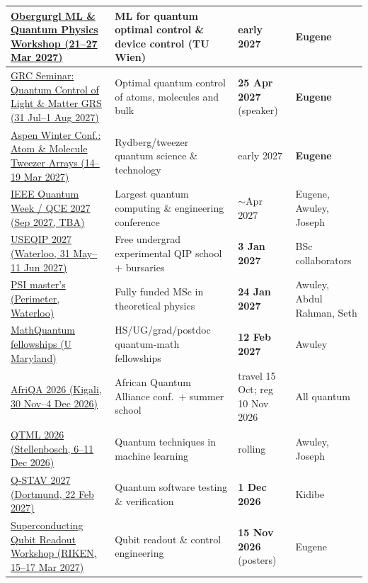 \documentclass[11pt,a4paper]{article}
\begin{document}
\begin{longtable}{@{}p{3.4cm}p{5.6cm}p{2.2cm}p{2.7cm}@{}}
\midrule
\href{https://mlqp-obergurgl.conf.tuwien.ac.at/}{Obergurgl ML \& Quantum Physics Workshop (21--27 Mar 2027)} & ML for quantum optimal control \& device control (TU Wien) & early 2027 & \textbf{Eugene} \\
\midrule
\href{https://www.grc.org/quantum-control-of-light-and-matter-grs-conference/2027/}{GRC Seminar: Quantum Control of Light \& Matter GRS (31 Jul--1 Aug 2027)} & Optimal quantum control of atoms, molecules and bulk & \textbf{25 Apr 2027} (speaker) & \textbf{Eugene} \\
\midrule
\href{https://www.aspentweezerarrays2027.org/}{Aspen Winter Conf.: Atom \& Molecule Tweezer Arrays (14--19 Mar 2027)} & Rydberg/tweezer quantum science \& technology & early 2027 & \textbf{Eugene} \\
\midrule
\href{https://qce.quantum.ieee.org/2026/}{IEEE Quantum Week / QCE 2027 (Sep 2027, TBA)} & Largest quantum computing \& engineering conference & $\sim$Apr 2027 & Eugene, Awuley, Joseph \\
\midrule
\href{https://uwaterloo.ca/institute-for-quantum-computing/events/undergraduate-school-experimental-quantum-information-0}{USEQIP 2027 (Waterloo, 31 May--11 Jun 2027)} & Free undergrad experimental QIP school $+$ bursaries & \textbf{3 Jan 2027} & BSc collaborators \\
\midrule
\href{https://perimeterinstitute.ca/training/masters-program/psi-how-apply}{PSI master's (Perimeter, Waterloo)} & Fully funded MSc in theoretical physics & \textbf{24 Jan 2027} & Awuley, Abdul Rahman, Seth \\
\midrule
\href{https://mathquantum.umd.edu/apply/}{MathQuantum fellowships (U Maryland)} & HS/UG/grad/postdoc quantum-math fellowships & \textbf{12 Feb 2027} & Awuley \\
\midrule
\href{https://afriqa.aimsric.org/}{AfriQA 2026 (Kigali, 30 Nov--4 Dec 2026)} & African Quantum Alliance conf.\ $+$ summer school & travel 15 Oct; reg 10 Nov 2026 & All quantum \\
\midrule
\href{https://africaquantumconsortium.substack.com/p/africa-quantum-consortium-memo-869}{QTML 2026 (Stellenbosch, 6--11 Dec 2026)} & Quantum techniques in machine learning & rolling & Awuley, Joseph \\
\midrule
\href{https://www.spp2514.kit.edu/Q-STAV_2027.php}{Q-STAV 2027 (Dortmund, 22 Feb 2027)} & Quantum software testing \& verification & \textbf{1 Dec 2026} & Kidibe \\
\midrule
\href{https://rqc.riken.jp/sqrw2027/}{Superconducting Qubit Readout Workshop (RIKEN, 15--17 Mar 2027)} & Qubit readout \& control engineering & \textbf{15 Nov 2026} (posters) & Eugene \\

\end{longtable}
\end{document}
